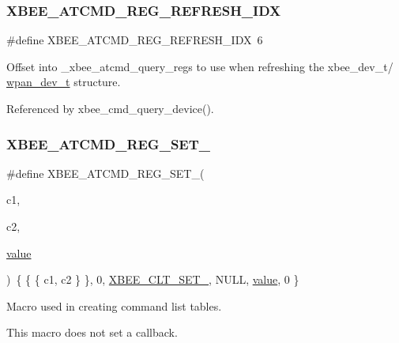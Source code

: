 \subsubsection{\texorpdfstring{X\+B\+E\+E\+\_\+\+A\+T\+C\+M\+D\+\_\+\+R\+E\+G\+\_\+\+R\+E\+F\+R\+E\+S\+H\+\_\+\+I\+DX}{XBEE\_ATCMD\_REG\_REFRESH\_IDX}}
{\footnotesize\ttfamily \#define X\+B\+E\+E\+\_\+\+A\+T\+C\+M\+D\+\_\+\+R\+E\+G\+\_\+\+R\+E\+F\+R\+E\+S\+H\+\_\+\+I\+DX~6}



Offset into \+\_\+xbee\+\_\+atcmd\+\_\+query\+\_\+regs to use when refreshing the xbee\+\_\+dev\+\_\+t/ \hyperlink{structwpan__dev__t}{wpan\+\_\+dev\+\_\+t} structure. 



Referenced by xbee\+\_\+cmd\+\_\+query\+\_\+device().

\mbox{\label{group__xbee__atcmd_ga37dcc1cfc854d7876be99eff279bf2a0}} 
\subsubsection{\texorpdfstring{X\+B\+E\+E\+\_\+\+A\+T\+C\+M\+D\+\_\+\+R\+E\+G\+\_\+\+S\+E\+T\+\_}{XBEE\_ATCMD\_REG\_SET\_8}}
{\footnotesize\ttfamily \#define X\+B\+E\+E\+\_\+\+A\+T\+C\+M\+D\+\_\+\+R\+E\+G\+\_\+\+S\+E\+T\+\_(\begin{DoxyParamCaption}\item[{}]{c1,  }\item[{}]{c2,  }\item[{}]{\hyperlink{group__zcl_ga1ed5b151a90f7e99af8cca2e6875ddf4}{value} }\end{DoxyParamCaption})~\{ \{ \{ c1, c2 \} \}, 0, \hyperlink{group__xbee__atcmd_gga1bd8ecd38c107579d20ded3c79a7d70ba0eb2ffa9c761ab74335695f818ce8410}{X\+B\+E\+E\+\_\+\+C\+L\+T\+\_\+\+S\+E\+T\+\_}, N\+U\+LL, \hyperlink{group__zcl_ga1ed5b151a90f7e99af8cca2e6875ddf4}{value}, 0 \}}



Macro used in creating command list tables. 

This macro does not set a callback.


